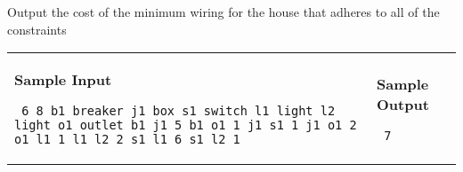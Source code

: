 \documentclass[11pt]{article}
\begin{document}
Output the cost of the minimum wiring for the house that adheres to all of the constraints

\vspace{0.25in}\hspace{-0.3in}\begin{tabular}{ll}

\parbox{3in}{{\large\bf Sample Input}

\vspace{0.15in}

{\tt 
6 8\linebreak
b1 breaker\linebreak
j1 box\linebreak
s1 switch\linebreak
l1 light\linebreak
l2 light\linebreak
o1 outlet\linebreak
b1 j1 5\linebreak
b1 o1 1\linebreak
j1 s1 1\linebreak
j1 o1 2\linebreak
o1 l1 1\linebreak
l1 l2 2\linebreak
s1 l1 6\linebreak
s1 l2 1\linebreak
}
}

&

\parbox{3in}{{\large\bf Sample Output}

\vspace{0.15in}

{\tt
7
}
}

\\
\end{tabular}
\end{document}
